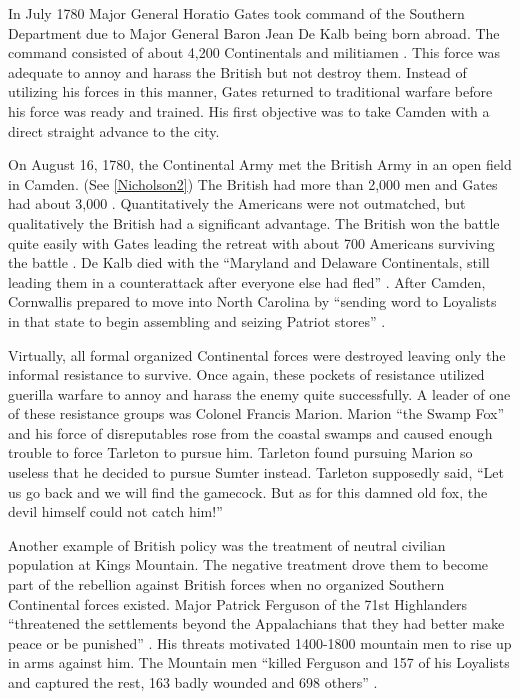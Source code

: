 In July 1780 Major General Horatio Gates took command of the Southern Department
due to Major General Baron Jean De Kalb being born abroad.  The command
consisted of about 4,200 Continentals and militiamen \cite[p.21]{moncure_cowpens_1996}.  This
force was adequate to annoy and harass the British but not destroy them.
Instead of utilizing his forces in this manner, Gates returned to traditional
warfare before his force was ready and trained.  His first objective was to take
Camden with a direct straight advance to the city. 

On August 16, 1780, the Continental Army met the British Army in an open field
in Camden. (See \ref{Nicholson2}) The British had more than 2,000 men and Gates had
about 3,000 \cite[p.19]{weigley_partisan_1970}.  Quantitatively the Americans were not outmatched,
but qualitatively the British had a significant advantage.  The British won the
battle quite easily with Gates leading the retreat with about 700 Americans
surviving the battle \cite[p.21]{weigley_partisan_1970}.  De Kalb died with the “Maryland and
Delaware Continentals, still leading them in a counterattack after everyone else
had fled” \cite[p.21]{weigley_partisan_1970}.  After Camden, Cornwallis prepared to move into North
Carolina by “sending word to Loyalists in that state to begin assembling and
seizing Patriot stores” \cite[p.27]{woodward_comparative_2002}.

Virtually, all formal organized Continental forces were destroyed leaving only
the informal resistance to survive.  Once again, these pockets of resistance
utilized guerilla warfare to annoy and harass the enemy quite successfully.  A
leader of one of these resistance groups was Colonel Francis Marion.  Marion
“the Swamp Fox” and his force of disreputables rose from the coastal swamps and
caused enough trouble to force Tarleton to pursue him.  Tarleton found pursuing
Marion so useless that he decided to pursue Sumter instead.  Tarleton supposedly
said, “Let us go back and we will find the gamecock.  But as for this damned old
fox, the devil himself could not catch him!” \cite[p.23]{weigley_partisan_1970}

Another example of British policy was the treatment of neutral civilian
population at Kings Mountain.  The negative treatment drove them to become part
of the rebellion against British forces when no organized Southern Continental
forces existed.  Major Patrick Ferguson of the 71st Highlanders “threatened the
settlements beyond the Appalachians that they had better make peace or be
punished” \cite[p.24]{weigley_partisan_1970}.  His threats motivated 1400-1800 mountain men to rise
up in arms against him.  The Mountain men “killed Ferguson and 157 of his
Loyalists and captured the rest, 163 badly wounded and 698 others”
\cite[25]{weigley_partisan_1970}. 


